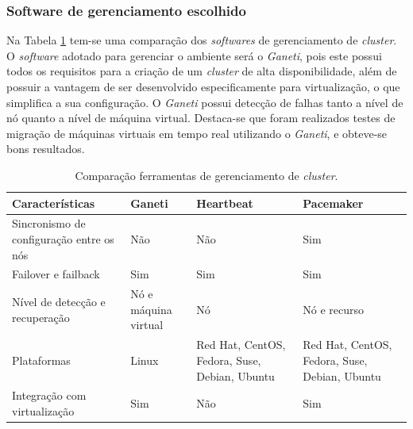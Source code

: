 \subsubsection{Software de gerenciamento escolhido}
\label{section:gerenciadorescolhido}

Na Tabela \ref{tab:clusterger} tem-se uma comparação dos \textit{softwares} de gerenciamento de \textit{cluster}. 
O \textit{software} adotado para gerenciar o ambiente será o \textit{Ganeti}, pois este possui todos os requisitos para a criação de um 
\textit{cluster} de alta disponibilidade, além de possuir a vantagem de ser desenvolvido especificamente para virtualização, o que simplifica a 
sua configuração. O \textit{Ganeti} possui detecção de falhas tanto a nível de nó quanto a nível de máquina virtual. 
Destaca-se que foram realizados testes de migração de máquinas virtuais em tempo real utilizando o \textit{Ganeti}, e obteve-se bons resultados.


\begin{table}[h!]
\caption{Comparação ferramentas de gerenciamento de \textit{cluster}.}
\label{tab:clusterger}
\begin{center}
\begin{tabular}{|p{4cm}|p{2cm}|p{3.5cm}|p{3.5cm}|}\hline
\textbf{Características} & \textbf{Ganeti} & \textbf{Heartbeat} & \textbf{Pacemaker} \\\hline
Sincronismo de configuração entre os nós & Não & Não & Sim \\\hline
Failover e failback & Sim & Sim & Sim \\\hline
Nível de detecção e recuperação & Nó e máquina virtual & Nó & Nó e recurso \\\hline
Plataformas & Linux & Red Hat, CentOS, Fedora, Suse, Debian, Ubuntu & Red Hat, CentOS, Fedora, Suse, Debian, Ubuntu \\\hline
Integração com virtualização & Sim & Não & Sim \\\hline
\end{tabular}
\end{center}
\end{table}

